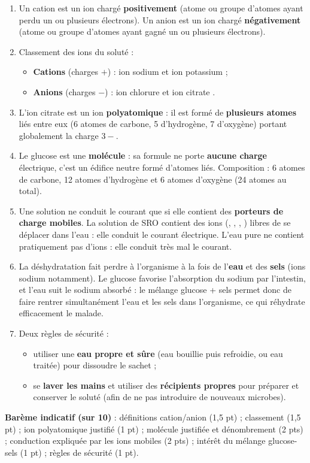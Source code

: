 \documentclass[11pt]{article}
\newcommand{\cle}[1]{{\popxbold\color{popdark}#1}}
\begin{document}
\begin{corrige}
\begin{enumerate}
\item Un \cle{cation} est un ion chargé \textbf{positivement} (atome ou groupe d'atomes ayant perdu un ou plusieurs électrons). Un \cle{anion} est un ion chargé \textbf{négativement} (atome ou groupe d'atomes ayant gagné un ou plusieurs électrons).
\item Classement des ions du soluté :
\begin{itemize}
\item \textbf{Cations} (charges $+$) : ion sodium  et ion potassium  ;
\item \textbf{Anions} (charges $-$) : ion chlorure  et ion citrate .
\end{itemize}
\item L'ion citrate  est un ion \textbf{polyatomique} : il est formé de \textbf{plusieurs atomes} liés entre eux (6 atomes de carbone, 5 d'hydrogène, 7 d'oxygène) portant globalement la charge $3-$.
\item Le glucose  est une \textbf{molécule} : sa formule ne porte \textbf{aucune charge} électrique, c'est un édifice neutre formé d'atomes liés. Composition : 6 atomes de carbone, 12 atomes d'hydrogène et 6 atomes d'oxygène (24 atomes au total).
\item Une solution ne conduit le courant que si elle contient des \textbf{porteurs de charge mobiles}. La solution de SRO contient des ions (, , , ) libres de se déplacer dans l'eau : elle conduit le courant électrique. L'eau pure ne contient pratiquement pas d'ions : elle conduit très mal le courant.
\item La déshydratation fait perdre à l'organisme à la fois de l'\textbf{eau} et des \textbf{sels} (ions sodium notamment). Le glucose favorise l'absorption du sodium par l'intestin, et l'eau suit le sodium absorbé : le mélange glucose + sels permet donc de faire rentrer simultanément l'eau et les sels dans l'organisme, ce qui réhydrate efficacement le malade.
\item Deux règles de sécurité :
\begin{itemize}
\item utiliser une \textbf{eau propre et sûre} (eau bouillie puis refroidie, ou eau traitée) pour dissoudre le sachet ;
\item se \textbf{laver les mains} et utiliser des \textbf{récipients propres} pour préparer et conserver le soluté (afin de ne pas introduire de nouveaux microbes).
\end{itemize}
\end{enumerate}
\textbf{Barème indicatif (sur 10)} : définitions cation/anion (1,5 pt) ; classement (1,5 pt) ; ion polyatomique justifié (1 pt) ; molécule justifiée et dénombrement (2 pts) ; conduction expliquée par les ions mobiles (2 pts) ; intérêt du mélange glucose-sels (1 pt) ; règles de sécurité (1 pt).


\end{corrige}
\end{document}
